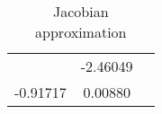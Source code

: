 
    \begin{table}\caption{Jacobian approximation}
\centering
    \begin{tabular}{|l|c|c|}
    \toprule
    \miderule6536 & -2.46049\\
-0.91717 & 0.00880\\

      \bottomrule
      \end{tabular}
      \end{table}